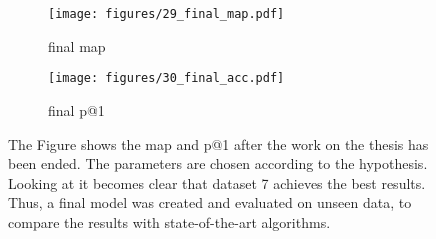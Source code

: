 %
\begin{figure}
	\centering
	\begin{subfigure}{.5\textwidth}
		\centering
		\texttt{[image: figures/29\_final\_map.pdf]}
		\caption{final \ac{map}}
		\label{fig:final_map}
	\end{subfigure}%
	\begin{subfigure}{.5\textwidth}
		\centering
		\texttt{[image: figures/30\_final\_acc.pdf]}
		\caption{final \ac{p@1}}
		\label{fig:final_acc}
	\end{subfigure}
	\caption{The Figure shows the \ac{map} and \ac{p@1} after the work on the thesis has been ended. The parameters are chosen according to the hypothesis. Looking at  it becomes clear that dataset 7 achieves the best results. Thus, a final model was created and evaluated on unseen data, to compare the results with state-of-the-art algorithms.}
	\label{fig:test}
\end{figure}
%




